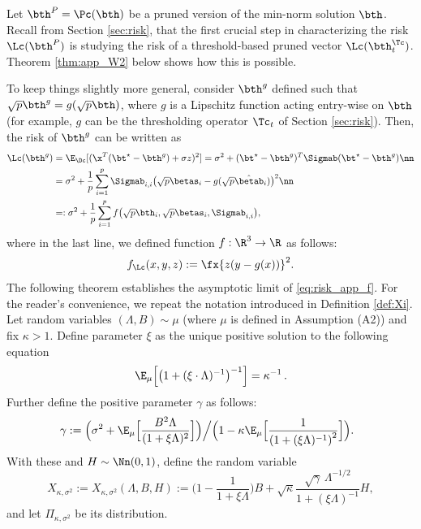 Let $\bth^P=\Pc(\bth)$ be a pruned version of the min-norm solution $\bth$. Recall from Section \ref{sec:risk}, that the first crucial step in characterizing the risk $\Lc(\bth^P)$ is studying the risk of a threshold-based pruned vector $\Lc(\bth^\Tc_t)$. Theorem \ref{thm:app_W2} below shows how this is possible. 

To keep things slightly more general,  consider $\bth^{g}$ defined such that $\sqrt{p}\bth^{g}=g(\sqrt{p}\bth)$, where $g$ is a Lipschitz function acting entry-wise on $\bth$ (for example, $g$ can be the  thresholding operator $\Tc_t$ of Section \ref{sec:risk}). Then,  the risk of $\bth^g$ can be written as
\begin{align}
\Lc(\bth^g) &= \E_{\Dc}[(\x^T(\bt^\star-\bth^g) + \sigma z)^2] = \sigma^2 + (\bt^\star-\bth^g)^T\Sigmab(\bt^\star-\bth^g) \nn \\
  &= \sigma^2 + \frac{1}{p}\sum_{i=1}^p\Sigmab_{i,i}\big(\sqrt{p}\betas_i-g(\sqrt{p}\hat\betab_i)\big)^2\nn
  \\
    &=: \sigma^2 + \frac{1}{p}\sum_{i=1}^p f\big(\sqrt{p}\bth_i,\sqrt{p}\betas_i,\Sigmab_{i,i}\big),\label{eq:risk_app_f}
\end{align}
where in the last line, we defined function $f:\R^3\rightarrow\R$ as follows:
\begin{align}\label{eq:fdef}
f_\Lc(x,y,z) := \fx{z(y-g(x))}^2.
\end{align}
The following theorem establishes the asymptotic limit of \eqref{eq:risk_app_f}. For the reader's convenience, we repeat the notation introduced in Definition \ref{def:Xi}.
Let random variables $(\Lambda,B)\sim \mu$ (where $\mu$ is defined in Assumption (A2)) and fix $\kappa>1$. Define parameter $\xi$ as the unique positive solution to the following equation
$$
\E_{\mu}\Big[ \big({1+(\xi\cdot\Lambda)^{-1}}\big)^{-1} \Big] = {\kappa^{-1}}\,.
$$
Further define the positive parameter $\gamma$ as follows:
$$
\hspace{-0.1in}\gamma := 
\Big({\sigma^2 + \E_{\mu}\Big[\frac{B^2\Lambda}{(1+\xi\Lambda)^2}\Big]}\Big)\Big/\Big({1-\kappa\E_{\mu}\Big[\frac{1}{\left(1+(\xi\Lambda)^{-1}\right)^2}\Big]}\Big).
$$
With these and $H\sim\Nn(0,1)$, define the random variable
$$
X_{\kappa,\sigma^2}:=X_{\kappa,\sigma^2}(\Lambda,B,H) := \Big(1-\frac{1}{1+ \xi\Lambda}\Big) B + \sqrt{\kappa}\frac{\sqrt{\gamma}\,\Lambda^{-1/2}}{1+(\xi\Lambda)^{-1}} H, 
$$
and let $\Pi_{\kappa,\sigma^2}$ be its distribution.

